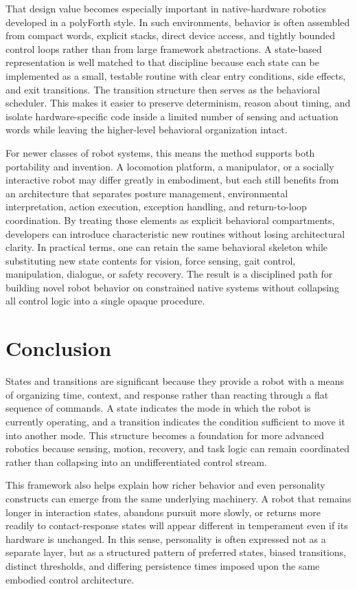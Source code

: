 \documentclass[11pt]{article}
\begin{document}
That design value becomes especially important in native-hardware
robotics developed in a polyForth style. In such environments,
behavior is often assembled from compact words, explicit stacks, direct
device access, and tightly bounded control loops rather than from large
framework abstractions. A state-based representation is well matched to
that discipline because each state can be implemented as a small,
testable routine with clear entry conditions, side effects, and exit
transitions. The transition structure then serves as the behavioral
scheduler. This makes it easier to preserve determinism, reason about
timing, and isolate hardware-specific code inside a limited number of
sensing and actuation words while leaving the higher-level behavioral
organization intact.

For newer classes of robot systems, this means the method supports both
portability and invention. A locomotion platform, a manipulator, or a
socially interactive robot may differ greatly in embodiment, but each
still benefits from an architecture that separates posture management,
environmental interpretation, action execution, exception handling, and
return-to-loop coordination. By treating those elements as explicit
behavioral compartments, developers can introduce characteristic new
routines without losing architectural clarity. In practical terms, one
can retain the same behavioral skeleton while substituting new state
contents for vision, force sensing, gait control, manipulation,
dialogue, or safety recovery. The result is a disciplined path for
building novel robot behavior on constrained native systems without
collapsing all control logic into a single opaque procedure.

\section*{Conclusion}

States and transitions are significant because they provide a robot
with a means of organizing time, context, and response rather than
reacting through a flat sequence of commands. A state indicates the
mode in which the robot is currently operating, and a transition
indicates the condition sufficient to move it into another mode. This
structure becomes a foundation for more advanced robotics because
sensing, motion, recovery, and task logic can remain coordinated rather
than collapsing into an undifferentiated control stream.

This framework also helps explain how richer behavior and even
personality constructs can emerge from the same underlying machinery. A
robot that remains longer in interaction states, abandons pursuit more
slowly, or returns more readily to contact-response states will appear
different in temperament even if its hardware is unchanged. In this
sense, personality is often expressed not as a separate layer, but as a
structured pattern of preferred states, biased transitions, distinct
thresholds, and differing persistence times imposed upon the same
embodied control architecture.
\end{document}
